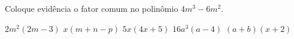 Coloque evidência o fator comum no polinômio $4m^3-6m^2$.

$2m^2(2m-3)$
$x(m+n-p)$
$5x(4x+5)$
$16a^3(a-4)$
$(a+b)(x+2)$


